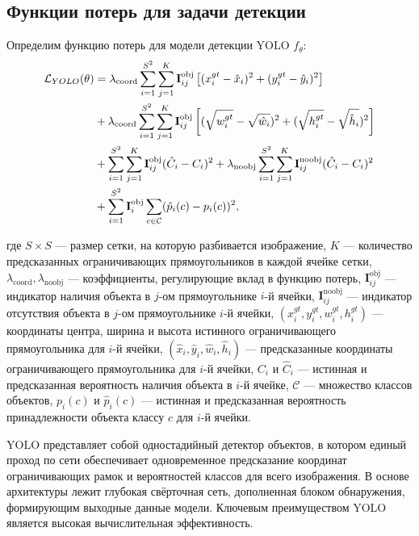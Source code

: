\subsection{Функции потерь для задачи детекции}
Определим функцию потерь для модели детекции YOLO\cite{DBLP:journals/corr/RedmonDGF15} $f_{\theta}$:
\begin{align*}
\mathcal{L}_{YOLO}(\theta) &= \lambda_{\text{coord}} \sum_{i=1}^{S^2} \sum_{j=1}^{K} \textbf{I}_{ij}^{\text{obj}} 
\left[ (x^{gt}_i - \hat{x}_i)^2 + (y^{gt}_i - \hat{y}_i)^2 \right] \notag \\
&+ \lambda_{\text{coord}} \sum_{i=1}^{S^2} \sum_{j=1}^{K} \textbf{I}_{ij}^{\text{obj}} 
\left[ (\sqrt{w^{gt}_i} - \sqrt{\hat{w}_i})^2 + (\sqrt{h^{gt}_i} - \sqrt{\hat{h}_i})^2 \right] \notag \\
&+ \sum_{i=1}^{S^2} \sum_{j=1}^{K} \textbf{I}_{ij}^{\text{obj}} (\hat{C}_i - C_i)^2 
+ \lambda_{\text{noobj}} \sum_{i=1}^{S^2} \sum_{j=1}^{K} \textbf{I}_{ij}^{\text{noobj}} (\hat{C}_i - C_i)^2 \notag \\
&+ \sum_{i=1}^{S^2} \textbf{I}_{i}^{\text{obj}} \sum_{c \in \mathcal{C}} (\hat{p}_i(c) - p_i(c))^2,
\end{align*}

где 
$S \times S$ — размер сетки, на которую разбивается изображение, $K$ — количество предсказанных ограничивающих прямоугольников в каждой ячейке сетки,  
$\lambda_{\text{coord}}, \lambda_{\text{noobj}}$ — коэффициенты, регулирующие вклад  в функцию потерь,
$\textbf{I}_{ij}^{\text{obj}}$ — индикатор наличия объекта в $j$-ом прямоугольнике $i$-й ячейки,  
$\textbf{I}_{ij}^{\text{noobj}}$ — индикатор отсутствия объекта в $j$-ом прямоугольнике $i$-й ячейки,  
$(x^{gt}_i, y^{gt}_i, w^{gt}_i, h^{gt}_i)$ — координаты центра, ширина и высота истинного ограничивающего прямоугольника для $i$-й ячейки,  
$(\hat{x}_i, \hat{y}_i, \hat{w}_i, \hat{h}_i)$ — предсказанные координаты ограничивающего прямоугольника для $i$-й ячейки,  
$C_i$ и $\hat{C}_i$ — истинная и предсказанная вероятность наличия объекта в $i$-й ячейке,  \(\mathcal{C}\) — множество классов объектов,
$p_i(c)$ и $\hat{p}_i(c)$ — истинная и предсказанная вероятность принадлежности объекта классу $c$ для $i$-й ячейки. 

YOLO представляет собой одностадийный детектор объектов, в котором единый проход по сети обеспечивает одновременное предсказание координат ограничивающих рамок и вероятностей классов для всего изображения. В основе архитектуры лежит глубокая свёрточная сеть, дополненная блоком обнаружения, формирующим выходные данные модели. Ключевым преимуществом YOLO является высокая вычислительная эффективность.

